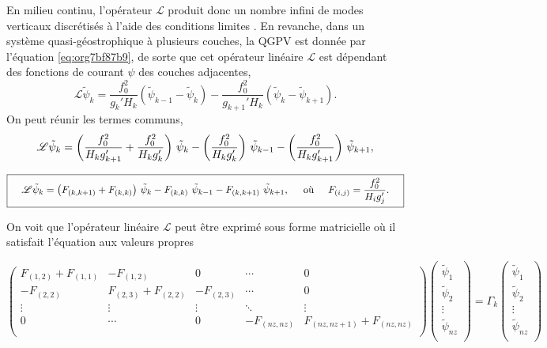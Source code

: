 \documentclass[10pt]{report}
\numberwithin{equation}{section}
\newcommand{\tpsi}{\tilde{\psi}}
\begin{document}
En milieu continu, l'opérateur \(\mathscr{L}\) produit donc un nombre infini de modes verticaux discrétisés à l'aide des conditions limites \autocite[p.468]{vallis_2006}.
En revanche, dans un système quasi-géostrophique à plusieurs couches, la QGPV est donnée par l'équation \ref{eq:org7bf87b9}, de sorte que cet opérateur linéaire \(\mathscr{L}\) est dépendant des fonctions de courant \(\psi\) des couches adjacentes,
\begin{equation}
\mathscr{L}\tpsi_k = \frac{f_0^2}{g_k' H_k} (\tpsi_{k-1} - \tpsi_k) - \frac{f_0^2}{g_{k+1}'H_k} (\tpsi_k - \tpsi_{k+1}).
\end{equation}
On peut réunir les termes communs,
\begin{align}
\mathscr{L} \tpsi_k = \qty( \frac{f_0^2}{H_k g'_{k+1}} + \frac{f_0^2}{H_k g'_{k}} )\ \tpsi_k
- \qty(\frac{f_0^2}{H_k g'_{k}})\ \tpsi_{k-1}
- \qty(\frac{f_0^2}{H_k g'_{k+1}})\ \tpsi_{k+1},\nonumber
\end{align}

\begin{equation}
\boxed{\hspace{0.4cm}
\mathscr{L}\tpsi_k = \qty( F_{(k,k+1)} + F_{(k,k)}) \ \tpsi_k
- F_{(k,k)}\ \tpsi_{k-1}
- F_{(k,k+1)}\ \tpsi_{k+1},
\hspace{0.5cm}\text{où}\hspace{0.5cm}
F_{(i,j)} = \frac{f_0^2}{H_i g'_j}.
\hspace{0.4cm} }
\end{equation}

On voit que l'opérateur linéaire \(\mathscr{L}\) peut être exprimé sous forme matricielle où il satisfait l'équation aux valeurs propres

\[
\begin{pmatrix}
 F_{(1,2)} + F_{(1,1)} & -F_{(1,2)} & 0 & \cdots & 0 \\[0pt]
 -F_{(2,2)} & F_{(2,3)} + F_{(2,2)} & -F_{(2,3)} & \cdots & 0 \\[0pt]
 \vdots & \vdots & \vdots & \ddots & \vdots \\[0pt]
 0 & \cdots & 0 & -F_{(nz,nz)} & F_{(nz,nz+1)} + F_{(nz,nz)} \\[0pt]
\end{pmatrix}
\begin{pmatrix}
 \tpsi_1 \\[0pt]
 \tpsi_2 \\[0pt]
 \vdots \\[0pt]
 \tpsi_{nz} \\[0pt]
\end{pmatrix}
=\Gamma_k\begin{pmatrix}
 \tpsi_1 \\[0pt]
 \tpsi_2 \\[0pt]
 \vdots \\[0pt]
 \tpsi_{nz} \\[0pt]
\end{pmatrix}
\]
\end{document}
